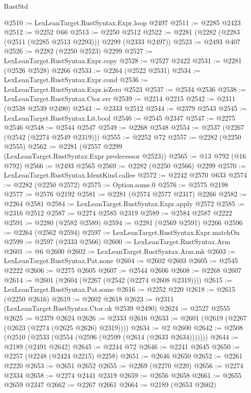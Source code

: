 \begin{lexlean}{RustStd}
\begin{coremodule}
@2510 := LexLeanTarget.RustSyntax.Expr.loop @2497
@2511 := @2285 @2423
@2512 := @2252 @66
@2513 := @2250 @2512
@2522 := @2281 (@2282 (@2283 (@2511 (@2285 @2513 @2293))) @2299 (@2333 @2497))
@2523 := @2493 @407
@2526 := @2282 (@2250 @2523) @2299
@2527 := LexLeanTarget.RustSyntax.Expr.copy
@2528 := @2527 @2422
@2531 := @2281 (@2526 @2528) @2266
@2533 := @2264 (@2522 @2531)
@2534 := LexLeanTarget.RustSyntax.Expr.cond
@2536 := LexLeanTarget.RustSyntax.Expr.isZero @2523
@2537 := @2534 @2536
@2538 := LexLeanTarget.RustSyntax.Ctor.err
@2539 := @2214 @2215
@2542 := @2311 (@2538 @2539 @2490)
@2543 := @2333 @2512
@2544 := @2379 @2543
@2545 := LexLeanTarget.RustSyntax.Lit.bool
@2546 := @2545 @2347
@2547 := @2275 @2546
@2548 := @2544 @2547
@2549 := @2268 @2548
@2554 := @2537 (@2267 (@2542 (@2274 @2549 @2319)))
@2555 := @2252 @72
@2557 := @2282 (@2250 @2555)
@2562 := @2281 (@2557 @2299 (LexLeanTarget.RustSyntax.Expr.predecessor @2523))
@2565 := @13 @792 (@16 @792)
@2566 := @2493 @2565
@2569 := @2282 (@2250 @2566) @2299
@2570 := LexLeanTarget.RustSyntax.IdentKind.callee
@2572 := @2242 @2570 @633
@2574 := @2282 (@2250 @2572)
@2575 := Option.some.{0}
@2576 := @2575 @2198
@2577 := @2576 @2192
@2581 := @2281 (@2574 @2577 @2317) @2266
@2582 := @2264 @2581
@2584 := LexLeanTarget.RustSyntax.Expr.apply @2572
@2585 := @2316 @2512
@2587 := @2274 @2585 @2319
@2589 := @2584 @2587 @2222
@2591 := @2280 (@2582 @2589)
@2594 := @2281 (@2569 @2591) @2266
@2596 := @2264 (@2562 @2594)
@2597 := LexLeanTarget.RustSyntax.Expr.matchOn
@2599 := @2597 (@2333 @2566)
@2600 := LexLeanTarget.RustSyntax.Arm
@2601 := @6 @2600
@2602 := LexLeanTarget.RustSyntax.Arm.mk
@2603 := LexLeanTarget.RustSyntax.Pat.none
@2604 := @2602 @2603
@2605 := @2545 @2222
@2606 := @2275 @2605
@2607 := @2544 @2606
@2608 := @2268 @2607
@2614 := @2601 (@2604 (@2267 (@2542 (@2274 @2608 @2319))))
@2615 := LexLeanTarget.RustSyntax.Pat.some
@2616 := @2252 @220
@2618 := @2615 (@2250 @2616)
@2619 := @2602 @2618
@2623 := @2311 (LexLeanTarget.RustSyntax.Ctor.ok @2539 @2490)
@2624 := @2527 @2555
@2625 := @2379 @2624
@2626 := @2333 @2616
@2633 := @2601 (@2619 (@2267 (@2623 (@2274 (@2625 @2626) @2319))))
@2634 := @2 @2600
@2642 := @2508 (@2510 (@2533 (@2554 (@2596 (@2599 (@2614 (@2633 @2634)))))))
@2644 := @2189 (@2491 @2642)
@2645 := @2244 @72
@2646 := @2241 @2645
@2650 := @2257 (@2248 (@2424 @2215) @2258)
@2651 := @2646 @2650
@2652 := @2261 @2220
@2653 := @2651 @2652
@2655 := @2269 (@2270 @220)
@2656 := @2274 @2334
@2658 := @2274 @2441 @2319
@2659 := @2656 @2658
@2661 := @2655 @2659 @2347
@2662 := @2267 @2661
@2664 := @2189 (@2653 @2662)

\end{coremodule}
\end{lexlean}
